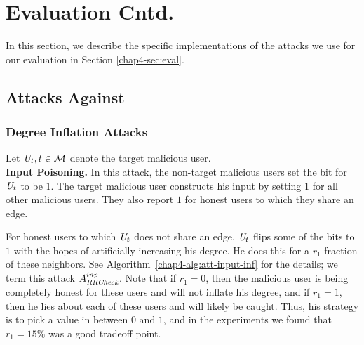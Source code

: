 \section{Evaluation Cntd.}\label{chap4-app:attacks}
In this section, we describe the specific implementations of the attacks we use for our evaluation in Section \ref{chap4-sec:eval}.

\subsection{Attacks Against \DegRRCheck{}}

\subsubsection{Degree Inflation Attacks}
Let $\textit{U}_t, t \in \mathcal{M}$ denote the target malicious user. 
\\
\noindent\textbf{Input Poisoning.} In this attack, the non-target malicious users set the bit for $\textit{U}_t$ to be $1$. The target malicious user constructs his input by setting $1$ for all other malicious users. They also report $1$ for honest users to which they share an edge. 

For honest users to which $\textit{U}_t$ does not share an edge, $\textit{U}_t$ flips some of the bits to $1$ with the hopes of artificially increasing his degree. He does this for a $r_1$-fraction of these neighbors. See Algorithm~\ref{chap4-alg:att-input-inf} for the details; we term this attack $A_{\textit{RRCheck}}^{inp}$. Note that if $r_1 = 0$, then the malicious user is being completely honest for these users and will not inflate his degree, and if $r_1 = 1$, then he lies about each of these users and will likely be caught. Thus, his strategy is to pick a value in between $0$ and $1$, and in the experiments we found that $r_1 = 15\%$ was a good tradeoff point.

%  
%

